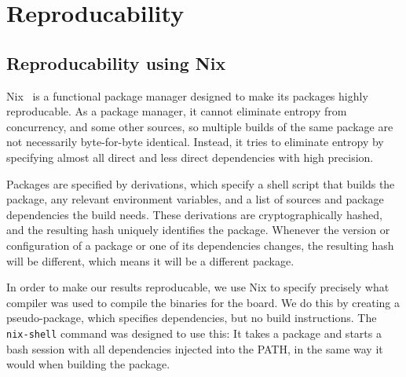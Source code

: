 \section{Reproducability}

\subsection{Reproducability using Nix}

Nix~\cite{nix} is a functional package manager designed to make its packages
highly reproducable. As a package manager, it cannot eliminate entropy from
concurrency, and some other sources, so multiple builds of the same package
are not necessarily byte-for-byte identical. Instead, it tries to eliminate
entropy by specifying almost all direct and less direct dependencies with high
precision.

Packages are specified by derivations, which specify a shell script that
builds the package, any relevant environment variables, and a list of
sources and package dependencies the build needs. These derivations are
cryptographically hashed, and the resulting hash uniquely identifies the
package. Whenever the version or configuration of a package or one of
its dependencies changes, the resulting hash will be different, which
means it will be a different package.

In order to make our results reproducable, we use Nix to specify
precisely what compiler was used to compile the binaries for the board.
We do this by creating a pseudo-package, which specifies dependencies,
but no build instructions. The \texttt{nix-shell} command was designed
to use this: It takes a package and starts a bash session with all
dependencies injected into the PATH, in the same way it would when
building the package.
